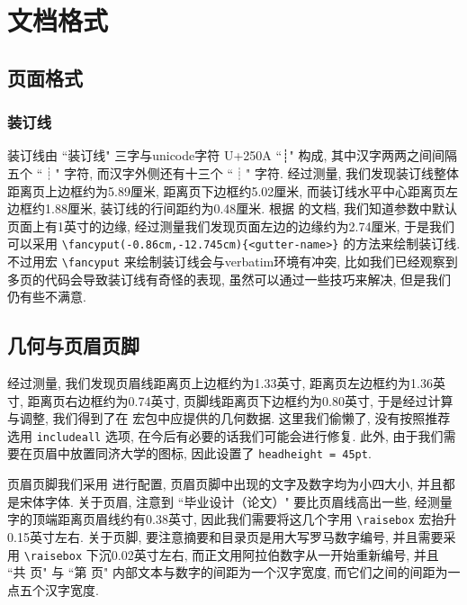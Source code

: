 
\section{文档格式}

\subsection{页面格式}

\subsubsection{装订线}

装订线由 ``装订线" 三字与unicode字符 U+250A ``┊" 构成, 其中汉字两两之间间隔五个 ``┊" 字符, 而汉字外侧还有十三个 ``┊" 字符. 经过测量, 我们发现装订线整体距离页上边框约为5.89厘米, 距离页下边框约5.02厘米, 而装订线水平中心距离页左边框约1.88厘米, 装订线的行间距约为0.48厘米. 根据  的文档, 我们知道参数中默认页面上有1英寸的边缘, 经过测量我们发现页面左边的边缘约为2.74厘米, 于是我们可以采用 \verb|\fancyput(-0.86cm,-12.745cm){<gutter-name>}| 的方法来绘制装订线. 不过用宏 \verb|\fancyput| 来绘制装订线会与verbatim环境有冲突, 比如我们已经观察到多页的代码会导致装订线有奇怪的表现, 虽然可以通过一些技巧来解决, 但是我们仍有些不满意.

\subsection{几何与页眉页脚}

经过测量, 我们发现页眉线距离页上边框约为1.33英寸, 距离页左边框约为1.36英寸, 距离页右边框约为0.74英寸, 页脚线距离页下边框约为0.80英寸, 于是经过计算与调整, 我们得到了在  宏包中应提供的几何数据. 这里我们偷懒了, 没有按照推荐选用 \verb|includeall| 选项, 在今后有必要的话我们可能会进行修复. 此外, 由于我们需要在页眉中放置同济大学的图标, 因此设置了 \verb|headheight = 45pt|.

页眉页脚我们采用  进行配置, 页眉页脚中出现的文字及数字均为小四大小, 并且都是宋体字体. 关于页眉, 注意到 ``毕业设计（论文）" 要比页眉线高出一些, 经测量字的顶端距离页眉线约有0.38英寸, 因此我们需要将这几个字用 \verb|\raisebox| 宏抬升0.15英寸左右. 关于页脚, 要注意摘要和目录页是用大写罗马数字编号, 并且需要采用 \verb|\raisebox| 下沉0.02英寸左右, 而正文用阿拉伯数字从一开始重新编号, 并且 ``共 页" 与 ``第 页" 内部文本与数字的间距为一个汉字宽度, 而它们之间的间距为一点五个汉字宽度.

